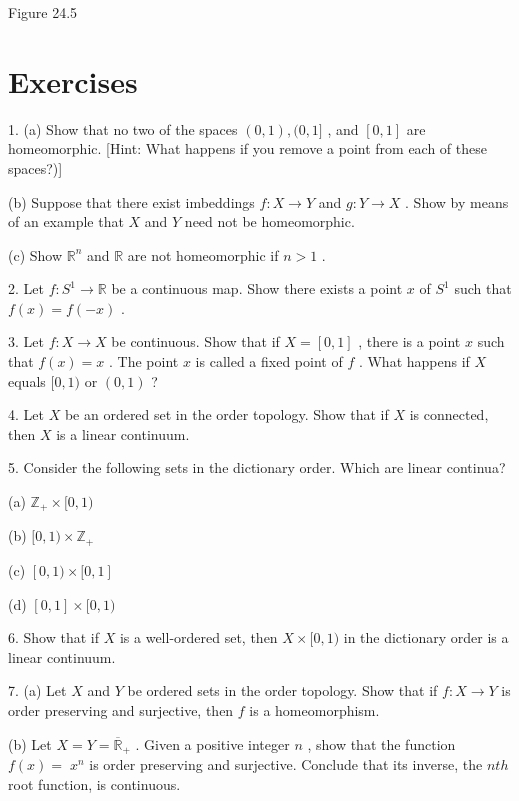 \documentclass[10pt]{article}
\begin{document}
Figure 24.5

\section*{Exercises}

1. (a) Show that no two of the spaces \(\left( {0,1}\right) ,(0,1\rbrack\) , and \(\left\lbrack  {0,1}\right\rbrack\) are homeomorphic. [Hint: What happens if you remove a point from each of these spaces?)]

(b) Suppose that there exist imbeddings \(f : X \rightarrow  Y\) and \(g : Y \rightarrow  X\) . Show by means of an example that \(X\) and \(Y\) need not be homeomorphic.

(c) Show \({\mathbb{R}}^{n}\) and \(\mathbb{R}\) are not homeomorphic if \(n > 1\) .

2. Let \(f : {S}^{1} \rightarrow  \mathbb{R}\) be a continuous map. Show there exists a point \(x\) of \({S}^{1}\) such that \(f\left( x\right)  = f\left( {-x}\right)\) .

3. Let \(f : X \rightarrow  X\) be continuous. Show that if \(X = \left\lbrack  {0,1}\right\rbrack\) , there is a point \(x\) such that \(f\left( x\right)  = x\) . The point \(x\) is called a fixed point of \(f\) . What happens if \(X\) equals \(\lbrack 0,1)\) or \(\left( {0,1}\right)\) ?

4. Let \(X\) be an ordered set in the order topology. Show that if \(X\) is connected, then \(X\) is a linear continuum.

5. Consider the following sets in the dictionary order. Which are linear continua?

(a) \({\mathbb{Z}}_{ + } \times  \lbrack 0,1)\)

(b) \(\lbrack 0,1) \times  {\mathbb{Z}}_{ + }\)

(c) \(\left\lbrack  {0,1)\times \lbrack 0,1}\right\rbrack\)

(d) \(\left\lbrack  {0,1}\right\rbrack   \times  \lbrack 0,1)\)

6. Show that if \(X\) is a well-ordered set, then \(X \times  \lbrack 0,1)\) in the dictionary order is a linear continuum.

7. (a) Let \(X\) and \(Y\) be ordered sets in the order topology. Show that if \(f : X \rightarrow  Y\) is order preserving and surjective, then \(f\) is a homeomorphism.

(b) Let \(X = Y = {\overline{\mathbb{R}}}_{ + }\) . Given a positive integer \(n\) , show that the function \(f\left( x\right)  = \; {x}^{n}\) is order preserving and surjective. Conclude that its inverse, the \({nth}\) root function, is continuous.
\end{document}
